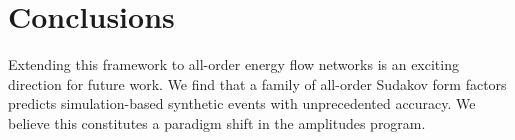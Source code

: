 \section{Conclusions}\label{sec:conclusions}

Extending this framework to all-order energy flow networks is an
exciting direction for future work. We find that a family of all-order
Sudakov form factors predicts simulation-based synthetic events with
unprecedented accuracy. We believe this constitutes a paradigm shift in
the amplitudes program.

